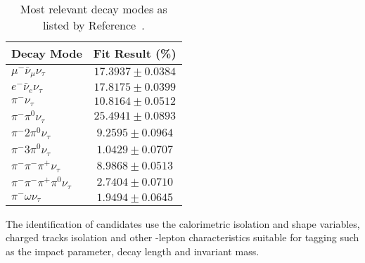 \begin{table}[h]
\centering
\begin{tabular}{l|c}
\toprule
Decay Mode & Fit Result (\%) \\
\midrule
$\mu^-   \bar{\nu}_{\mu}\nu_{\tau}$ & $17.3937 \pm 0.0384$ \\
$e^-   \bar{\nu}_{e}\nu_{\tau}$ & $17.8175 \pm 0.0399$ \\
$\pi^-   \nu_{\tau}$ & $10.8164 \pm 0.0512$ \\
$\pi^-\pi^0   \nu_{\tau}$ & $25.4941 \pm 0.0893$ \\
$\pi^-2\pi^0   \nu_{\tau}$  & $9.2595 \pm 0.0964$ \\
$\pi^-3\pi^0   \nu_{\tau}$ & $1.0429 \pm 0.0707$ \\
$\pi^- \pi^-\pi^+\nu_{\tau}$ & $8.9868 \pm 0.0513$\\
$\pi^- \pi^-\pi^+\pi^0\nu_{\tau}$ & $2.7404 \pm 0.0710$\\
$\pi^- \omega\nu_{\tau}$ & $1.9494 \pm 0.0645$ \\
\bottomrule
\end{tabular}
\caption{Most relevant \Ptau decay modes as listed by Reference~\cite{Workman:2022ynf}.}%
\label{tab:Chap3:Reco:Tau:DecayModes}
\end{table}


The identification of \tauhad candidates use the calorimetric isolation and shape variables,
charged tracks isolation and other \Ptau-lepton characteristics suitable for tagging such as the impact parameter,
decay length and invariant mass.

